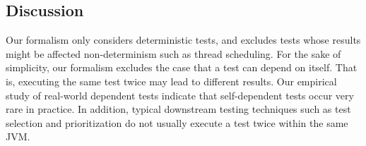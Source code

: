 \subsection{Discussion}
\label{sec:formaldiscussion}

Our formalism only considers deterministic tests,
and excludes tests whose results might be affected non-determinism such as thread scheduling.
For the sake of simplicity, our formalism excludes the case that a test 
can depend on itself. That is, executing the same test twice
may lead to different results. Our empirical study of
real-world dependent tests indicate that self-dependent tests
occur very rare in practice. In addition, typical
downstream testing techniques such as test selection and
prioritization do not usually execute a test twice within the same JVM.


